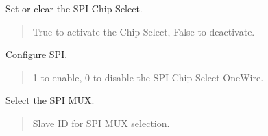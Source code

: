 \documentclass[letterpaper,10pt,english]{sphinxmanual}
\begin{document}
\begin{fulllineitems}
\begin{fulllineitems}
\label{\detokenize{cplddocs:management_flash.MngProgFlash.spi_chipselect}}
\pysigstartsignatures
{}
\pysigstopsignatures
\sphinxAtStartPar
Set or clear the SPI Chip Select.
\begin{quote}\begin{description}
\sphinxAtStartPar
{} \textendash{} True to activate the Chip Select, False to deactivate.

\end{description}\end{quote}

\end{fulllineitems}


\begin{fulllineitems}
\label{\detokenize{cplddocs:management_flash.MngProgFlash.spi_config}}
\pysigstartsignatures
{}
\pysigstopsignatures
\sphinxAtStartPar
Configure SPI.
\begin{quote}\begin{description}
\sphinxAtStartPar
{} \textendash{} 1 to enable, 0 to disable the SPI Chip Select One\sphinxhyphen{}Wire.

\end{description}\end{quote}

\end{fulllineitems}


\begin{fulllineitems}
\label{\detokenize{cplddocs:management_flash.MngProgFlash.spi_mux_selection}}
\pysigstartsignatures
{}
\pysigstopsignatures
\sphinxAtStartPar
Select the SPI MUX.
\begin{quote}\begin{description}
\sphinxAtStartPar
{} \textendash{} Slave ID for SPI MUX selection.


\end{description}
\end{quote}
\end{fulllineitems}
\end{fulllineitems}
\end{document}
